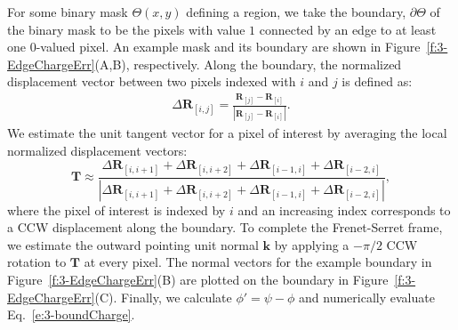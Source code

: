 For some binary mask $\Theta(x,y)$ defining a region, we take the boundary, $\partial \Theta$ of the binary mask to be the pixels with value $1$ connected by an edge to at least one $0$-valued pixel.
An example mask and its boundary are shown in Figure~\ref{f:3-EdgeChargeErr}(A,B), respectively.
Along the boundary, the normalized displacement vector between two pixels indexed with $i$ and $j$ is defined as:
\begin{align}
  \Delta \mathbf{R}_{[i,j]} =  \frac{\mathbf{R}_{[j]}-\mathbf{R}_{[i]}}{|\mathbf{R}_{[j]}-\mathbf{R}_{[i]}|}.
\end{align}
We estimate the unit tangent vector for a pixel of interest by averaging the local normalized displacement vectors:
\begin{equation}
  \mathbf{T} \approx \frac{\Delta \mathbf{R}_{[i,i+1]} + \Delta \mathbf{R}_{[i,i+2]} + \Delta \mathbf{R}_{[i-1,i]} + \Delta \mathbf{R}_{[i-2,i]}}{|\Delta \mathbf{R}_{[i,i+1]} + \Delta \mathbf{R}_{[i,i+2]} + \Delta \mathbf{R}_{[i-1,i]} + \Delta \mathbf{R}_{[i-2,i]}|},
\end{equation}
where the pixel of interest is indexed by $i$ and an increasing index corresponds to a CCW displacement along the boundary.
To complete the Frenet-Serret frame, we estimate the outward pointing unit normal $\mathbf{k}$ by applying a $-\pi/2$ CCW rotation to $\mathbf{T}$ at every pixel.
The normal vectors for the example boundary in Figure~\ref{f:3-EdgeChargeErr}(B) are plotted on the boundary in Figure~\ref{f:3-EdgeChargeErr}(C).
Finally, we calculate $\phi' = \psi-\phi$ and numerically evaluate Eq.~\ref{e:3-boundCharge}.
